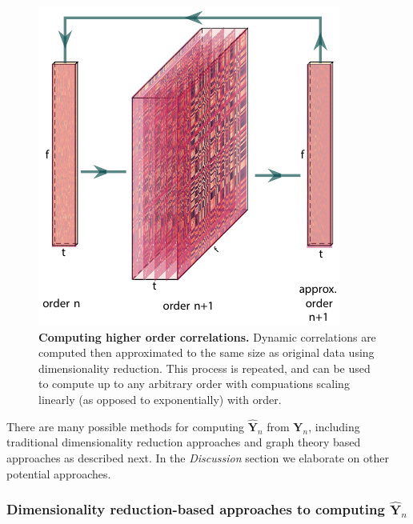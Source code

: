 \documentclass[english]{article}
\begin{document}
\begin{figure}
  \centering
  \includegraphics[width=\textwidth]{figs/methods_fig}
  \caption{\textbf{Computing higher order correlations. } Dynamic
    correlations
  are computed then approximated to the same size as original data
  using dimensionality reduction.
  This process is repeated, and can be used to compute up to any
  arbitrary order with compuations scaling linearly (as opposed to exponentially) with order. }
  \label{fig:methods_fig}
\end{figure}


There are many possible methods for computing $\hat{\mathbf{Y}}_n$
from $\mathbf{Y}_n$, including traditional dimensionality reduction
approaches and graph theory based approaches as described next.  In the
\textit{Discussion} section we elaborate on other potential approaches.

\subsubsection*{Dimensionality reduction-based approaches to computing
  $\hat{\mathbf{Y}}_n$}
\end{document}
